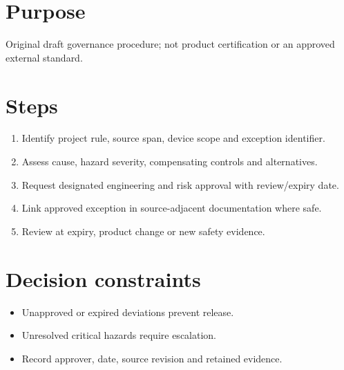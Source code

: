 \documentclass[10pt,letterpaper]{article}
\begin{document}
\makedoctitle
\makedocsummary
\section{Purpose}
Original draft governance procedure; not product certification or an approved external standard.
\section{Steps}
\begin{enumerate}
\item Identify project rule, source span, device scope and exception identifier.
\item Assess cause, hazard severity, compensating controls and alternatives.
\item Request designated engineering and risk approval with review/expiry date.
\item Link approved exception in source-adjacent documentation where safe.
\item Review at expiry, product change or new safety evidence.
\end{enumerate}

\section{Decision constraints}
\begin{itemize}
\item Unapproved or expired deviations prevent release.
\item Unresolved critical hazards require escalation.
\item Record approver, date, source revision and retained evidence.
\end{itemize}
\end{document}

